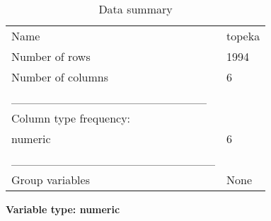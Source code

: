 \documentclass[
]{article}
\begin{document}
\begin{longtable}[]{@{}ll@{}}
\caption{Data summary}\tabularnewline
\toprule\noalign{}
\endfirsthead
\endhead
\bottomrule\noalign{}
\endlastfoot
Name & topeka \\
Number of rows & 1994 \\
Number of columns & 6 \\
\_\_\_\_\_\_\_\_\_\_\_\_\_\_\_\_\_\_\_\_\_\_\_ & \\
Column type frequency: & \\
numeric & 6 \\
\_\_\_\_\_\_\_\_\_\_\_\_\_\_\_\_\_\_\_\_\_\_\_\_ & \\
Group variables & None \\
\end{longtable}

\textbf{Variable type: numeric}
\end{document}
